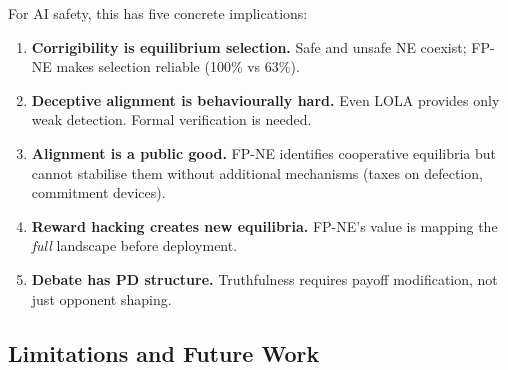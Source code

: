 \documentclass[11pt,a4paper]{article}
\begin{document}
For AI safety, this has five concrete implications:
\begin{enumerate}
    \item \textbf{Corrigibility is equilibrium selection.} Safe and
    unsafe NE coexist; FP-NE makes selection reliable (100\% vs 63\%).
    \item \textbf{Deceptive alignment is behaviourally hard.} Even
    LOLA provides only weak detection. Formal verification is needed.
    \item \textbf{Alignment is a public good.} FP-NE identifies
    cooperative equilibria but cannot stabilise them without additional
    mechanisms (taxes on defection, commitment devices).
    \item \textbf{Reward hacking creates new equilibria.} FP-NE's
    value is mapping the \emph{full} landscape before deployment.
    \item \textbf{Debate has PD structure.} Truthfulness requires
    payoff modification, not just opponent shaping.
\end{enumerate}

\subsection{Limitations and Future Work}
\end{document}

